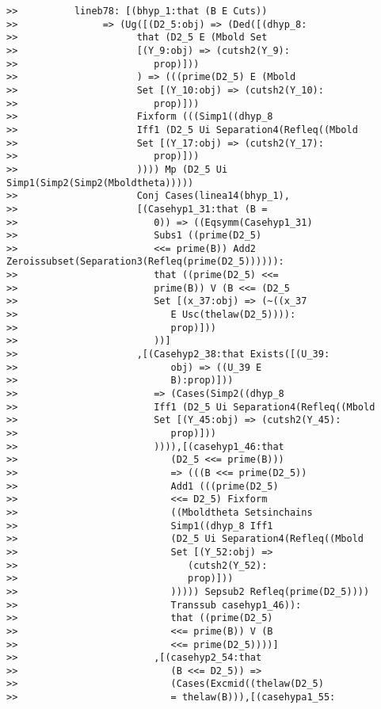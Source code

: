 \documentclass[12pt]{article}
\begin{document}
\begin{verbatim}
>>          lineb78: [(bhyp_1:that (B E Cuts))
>>               => (Ug([(D2_5:obj) => (Ded([(dhyp_8:
>>                     that (D2_5 E (Mbold Set
>>                     [(Y_9:obj) => (cutsh2(Y_9):
>>                        prop)]))
>>                     ) => (((prime(D2_5) E (Mbold
>>                     Set [(Y_10:obj) => (cutsh2(Y_10):
>>                        prop)]))
>>                     Fixform (((Simp1((dhyp_8
>>                     Iff1 (D2_5 Ui Separation4(Refleq((Mbold
>>                     Set [(Y_17:obj) => (cutsh2(Y_17):
>>                        prop)]))
>>                     )))) Mp (D2_5 Ui Simp1(Simp2(Simp2(Mboldtheta)))))
>>                     Conj Cases(linea14(bhyp_1),
>>                     [(Casehyp1_31:that (B =
>>                        0)) => ((Eqsymm(Casehyp1_31)
>>                        Subs1 ((prime(D2_5)
>>                        <<= prime(B)) Add2 Zeroissubset(Separation3(Refleq(prime(D2_5)))))):
>>                        that ((prime(D2_5) <<=
>>                        prime(B)) V (B <<= (D2_5
>>                        Set [(x_37:obj) => (~((x_37
>>                           E Usc(thelaw(D2_5)))):
>>                           prop)]))
>>                        ))]
>>                     ,[(Casehyp2_38:that Exists([(U_39:
>>                           obj) => ((U_39 E
>>                           B):prop)]))
>>                        => (Cases(Simp2((dhyp_8
>>                        Iff1 (D2_5 Ui Separation4(Refleq((Mbold
>>                        Set [(Y_45:obj) => (cutsh2(Y_45):
>>                           prop)]))
>>                        )))),[(casehyp1_46:that
>>                           (D2_5 <<= prime(B)))
>>                           => (((B <<= prime(D2_5))
>>                           Add1 (((prime(D2_5)
>>                           <<= D2_5) Fixform
>>                           ((Mboldtheta Setsinchains
>>                           Simp1((dhyp_8 Iff1
>>                           (D2_5 Ui Separation4(Refleq((Mbold
>>                           Set [(Y_52:obj) =>
>>                              (cutsh2(Y_52):
>>                              prop)]))
>>                           ))))) Sepsub2 Refleq(prime(D2_5))))
>>                           Transsub casehyp1_46)):
>>                           that ((prime(D2_5)
>>                           <<= prime(B)) V (B
>>                           <<= prime(D2_5))))]
>>                        ,[(casehyp2_54:that
>>                           (B <<= D2_5)) =>
>>                           (Cases(Excmid((thelaw(D2_5)
>>                           = thelaw(B))),[(casehypa1_55:

\end{verbatim}
\end{document}
